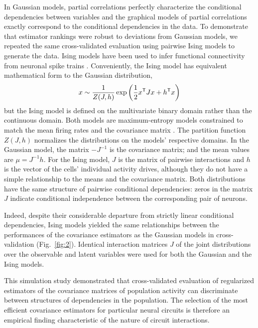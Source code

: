 In Gaussian models, partial correlations perfectly characterize the conditional dependencies between variables and the graphical models of partial correlations exactly correspond to the conditional dependencies in the data. 
To demonstrate that estimator rankings were robust to deviations from Gaussian models, we repeated the same cross-validated evaluation using pairwise Ising models to generate the data.
Ising models have been used to infer functional connectivity from neuronal spike trains \cite{Hertz:2011}. 
Conveniently, the Ising model has equivalent mathematical form to the Gaussian distribution,
\begin{equation}\label{eq:ising}
    x\sim \frac 1 {Z(J,h)} \exp\left(\frac 1 2 x^{\sf T} J x + h^{\sf T} x \right)
\end{equation}
but the Ising model is defined on the multivariate binary domain rather than the continuous domain. 
Both models are maximum-entropy models constrained to match the mean firing rates and the covariance matrix \cite{Jaynes:1957}.
The partition function $Z(J,h)$ normalizes the distributions on the models' respective domains. 
In the Gaussian model, the matrix $-J^{-1}$ is the covariance matrix; and the mean values are $\mu=J^{-1}h$.  
For the Ising model, $J$ is the matrix of pairwise interactions and $h$ is the vector of the cells' individual activity drives, although they do not have a simple relationship to the means and the covariance matrix. 
Both distributions have the same structure of pairwise conditional dependencies: zeros in the matrix $J$ indicate conditional independence between the corresponding pair of neurons. 

Indeed, despite their considerable departure from strictly linear conditional dependencies, Ising models yielded the same relationships between the performances of the covariance estimators as the Gaussian models in cross-validation (Fig.~\ref{fig:2}). Identical interaction matrices $J$  of the joint distributions over the observable and latent variables were used for both the Gaussian and the Ising models.

This simulation study demonstrated that cross-validated evaluation of regularized estimators of the covariance matrices of population activity can discriminate between structures of dependencies in the population. The selection of the most efficient covariance estimators for particular neural circuits is therefore an empirical finding characteristic of the nature of circuit interactions.

